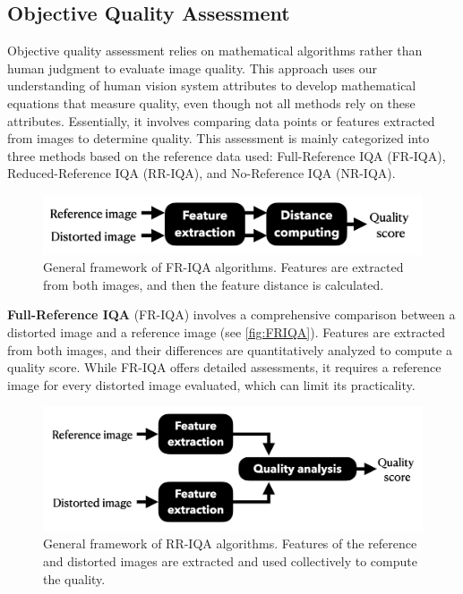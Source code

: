 \subsection{Objective Quality Assessment}
\label{sub:ObjectiveQualityAssessment}
Objective quality assessment relies on mathematical algorithms rather than human judgment to evaluate image quality. This approach uses our understanding of human vision system attributes to develop mathematical equations that measure quality, even though not all methods rely on these attributes. Essentially, it involves comparing data points or features extracted from images to determine quality. This assessment is mainly categorized into three methods based on the reference data used: Full-Reference IQA (FR-IQA), Reduced-Reference IQA (RR-IQA), and No-Reference IQA (NR-IQA). \par
\vspace{\baselineskip}
\begin{figure}[ht]
    \centering
    \includegraphics[keepaspectratio,width=15cm]{img/FRIQA.jpg}
    \caption{General framework of FR-IQA algorithms. Features are extracted from both images, and then the feature distance is calculated.}
    \label{fig:FRIQA}
\end{figure}
\noindent
\textbf{Full-Reference IQA} (FR-IQA) involves a comprehensive comparison between a distorted image and a reference image (see \autoref{fig:FRIQA}). Features are extracted from both images, and their differences are quantitatively analyzed to compute a quality score. While FR-IQA offers detailed assessments, it requires a reference image for every distorted image evaluated, which can limit its practicality. \par
\vspace{\baselineskip}
\begin{figure}[ht]
    \centering
    \includegraphics[keepaspectratio,width=15cm]{img/RRIQA.jpg}
    \caption{General framework of RR-IQA algorithms. Features of the reference and distorted images are extracted and used collectively to compute the quality.}
    \label{fig:RRIQA}
\end{figure}
